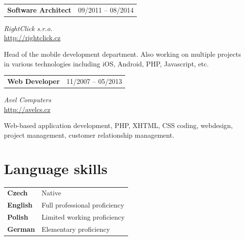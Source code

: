 \documentclass[10pt]{article} %
\begin{document}
\begin{minipage}[t]{0.44\textwidth}

\begin{tabularx}{\textwidth}{@{}Xr@{}}
\large\textbf{Software Architect} & \small\textsc{09/2011 -- 08/2014} \\
\end{tabularx}
\normalsize\textit{RightClick s.r.o.}\\
\normalsize\url{http://rightclick.cz}

\medskip
\normalsize {Head of the mobile development department. \newline Also working on multiple projects in various technologies including iOS, Android, PHP, Javascript, etc.}\\
\medskip 


\begin{tabularx}{\textwidth}{@{}Xr@{}}
\large\textbf{Web Developer} & \small\textsc{11/2007 -- 05/2013} \\
\end{tabularx}
\normalsize\textit{Avel Computers}\\
\normalsize\url{http://avelcs.cz}

\medskip
\normalsize {Web-based application development, PHP, XHTML, CSS coding, webdesign, project management, customer relationship management.}\\
\medskip 



\section{Language skills} 

\medskip 
\begin{tabular}{@{}ll}
\small\textbf{Czech} & Native\\
\small\textbf{English} & Full professional proficiency\\
\small\textbf{Polish} & Limited working proficiency\\
\small\textbf{German} & Elementary proficiency\\
\end{tabular}
\medskip

\end{minipage} %
\end{document}
